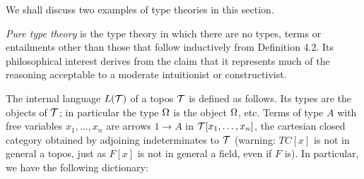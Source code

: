We shall discuss two examples of type theories in this section.

\begin{example}
{\em Pure type theory} is the type theory in which there are no
types, terms or entailments other than those that follow inductively from
Definition 4.2. Its philosophical interest derives from the claim that it
represents much of the reasoning acceptable to a moderate intuitionist or
constructivist.
\end{example}

\begin{example}
The internal language $L({\mathcal T})$ of a topos ${\mathcal T}$ is defined as
follows. Its types are the objects of ${\mathcal T}$; in particular the
type $\Omega$ is the object $\Omega$, etc. Terms of type $A$ with free variables
$x_1, \dots, x_n$ are arrows $1 \to A$ in ${\mathcal T}[x_1, \dots, x_n]$,
the cartesian closed category obtained by adjoining
indeterminates to ${\mathcal T}$ (warning: $TC[x]$ is not in general a topos, just as
$F[x]$ is not in general a field, even if $F$ is). In particular, we have the
following dictionary:
\end{example}

